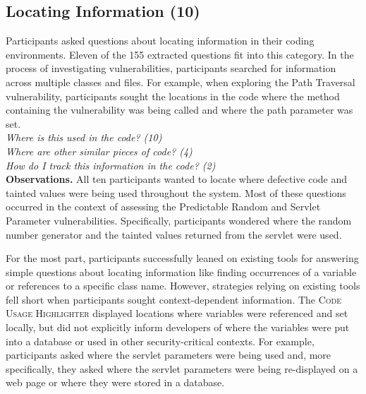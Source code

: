 \documentclass[conference]{IEEEtran}
\begin{document}

\noindent\subsection{\textbf{Locating Information (10)}}\label{li}

Participants asked questions about locating information in their coding environments. 
Eleven of the 155 extracted questions fit into this category.
In the process of investigating vulnerabilities, participants searched for information across multiple classes and files.
For example, when exploring the Path Traversal vulnerability, participants sought the locations in the code where the method containing the vulnerability was being called and where the path parameter was set.
\\

\noindent\emph{Where is this used in the code? (10)} \\
\emph{Where are other similar pieces of code? (4)} \\
\emph{How do I track this information in the code? (2)} \\



\noindent\textbf{Observations.}
All ten participants wanted to locate where defective code and tainted values were being used throughout the system. 
Most of these questions occurred in the context of assessing the Predictable Random and Servlet Parameter vulnerabilities.
Specifically, participants wondered where the random number generator and the tainted values returned from the servlet were used.

For the most part, participants successfully leaned on existing tools for answering simple questions about locating information like finding occurrences of a variable or references to a specific class name. 
However, strategies relying on existing tools fell short when participants sought context-dependent information. 
The \textsc{Code Usage Highlighter} displayed locations where variables were referenced and set locally, but did not explicitly inform developers of where the variables were put into a database or used in other security-critical contexts.
For example, participants asked where the servlet parameters were being used and, more specifically, they asked where the servlet parameters were being re-displayed on a web page or where they were stored in a database.
\end{document}
